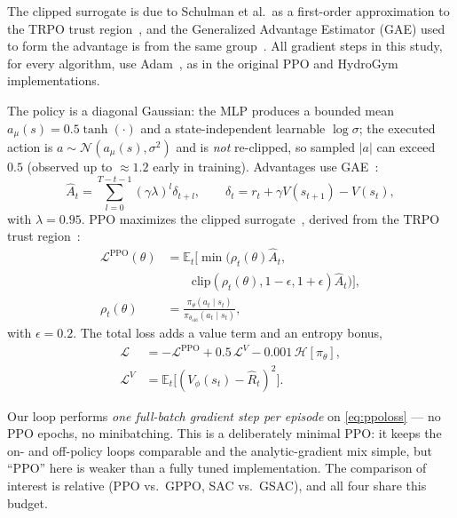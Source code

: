 The clipped surrogate is due to Schulman et al.\ as a first-order
approximation to the TRPO trust region~\cite{ppo2017,trpo2015}, and the
Generalized Advantage Estimator (GAE) used to form the advantage is from the
same group~\cite{gae2015}. All gradient steps in this study, for every
algorithm, use Adam~\cite{kingma2015adam}, as in the original PPO and
HydroGym~\cite{hydrogym2026} implementations.

The policy is a diagonal Gaussian: the MLP produces a bounded mean
$a_{\mu}(s)=0.5\tanh(\cdot)$ and a state-independent learnable
$\log\sigma$; the executed action is $a\sim\mathcal{N}(a_\mu(s),\sigma^2)$
and is \emph{not} re-clipped, so sampled $\lvert a\rvert$ can exceed
$0.5$ (observed up to $\approx 1.2$ early in training). Advantages use
GAE~\cite{gae2015}:
\begin{equation}
  \hat{A}_t=\sum_{l=0}^{T-t-1}(\gamma\lambda)^{l}\delta_{t+l},\qquad
  \delta_t=r_t+\gamma V(s_{t+1})-V(s_t),
  \label{eq:gae}
\end{equation}
with $\lambda=0.95$. PPO maximizes the clipped
surrogate~\cite{ppo2017}, derived from the TRPO trust
region~\cite{trpo2015}:
\begin{equation}
  \begin{split}
    \mathcal{L}^{\mathrm{PPO}}(\theta)&=\mathbb{E}_t\!\Big[\min\!\big(\rho_t(\theta)\hat{A}_t,\\
    &\qquad \mathrm{clip}(\rho_t(\theta),1-\epsilon,1+\epsilon)\hat{A}_t\big)\Big],\\
    \rho_t(\theta)&=\frac{\pi_\theta(a_t\mid s_t)}{\pi_{\theta_{\text{old}}}(a_t\mid s_t)},
  \end{split}
  \label{eq:ppo}
\end{equation}
with $\epsilon=0.2$. The total loss adds a value term and an entropy bonus,
\begin{equation}
  \begin{split}
    \mathcal{L}&=-\mathcal{L}^{\mathrm{PPO}}+0.5\,\mathcal{L}^{V}-0.001\,\mathcal{H}[\pi_\theta],\\
    \mathcal{L}^{V}&=\mathbb{E}_t\big[(V_\phi(s_t)-\hat{R}_t)^2\big].
  \end{split}
  \label{eq:ppoloss}
\end{equation}

Our loop performs \emph{one
full-batch gradient step per episode} on \cref{eq:ppoloss} --- no PPO
epochs, no minibatching. This is a deliberately minimal PPO: it keeps the
on- and off-policy loops comparable and the analytic-gradient mix simple,
but ``PPO'' here is weaker than a fully tuned implementation. The comparison
of interest is relative (PPO vs.\ GPPO, SAC vs.\ GSAC), and all four share
this budget.

